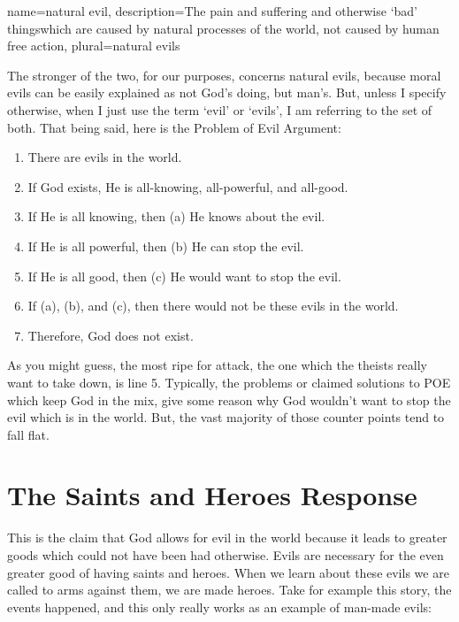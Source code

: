 {
name=natural evil,
description={The pain and suffering and otherwise `bad' thingswhich are caused by natural processes of the world, not caused by human free action},
plural=natural evils
}


The stronger of the two, for our purposes, concerns natural evils, because moral evils can be easily explained as not God's doing, but man's. But, unless I specify otherwise, when I just use the term ‘evil’ or ‘evils’, I am referring to the set of both. That being said, here is the Problem of Evil Argument:
\begin{enumerate}
    \item There are evils in the world.
    \item If God exists, He is all-knowing, all-powerful, and all-good.
    \item If He is all knowing, then (a) He knows about the evil.
    \item If He is all powerful, then (b) He can stop the evil.
    \item If He is all good, then (c) He would want to stop the evil.
    \item If (a), (b), and (c), then there would not be these evils in the world.
    \item Therefore, God does not exist.
\end{enumerate}
As you might guess, the most ripe for attack, the one which the theists really want to take down, is line 5. Typically, the problems or claimed solutions to POE which keep God in the mix, give some reason why God wouldn't want to stop the evil which is in the world. But, the vast majority of those counter points tend to fall flat. 

\section{The Saints and Heroes Response}
This is the claim that God allows for evil in the world because it leads to greater goods which could not have been had otherwise. Evils are necessary for the even greater good of having saints and heroes. When we learn about these evils we are called to arms against them, we are made heroes. Take for example this story, the events happened, and this only really works as an example of man-made evils:

